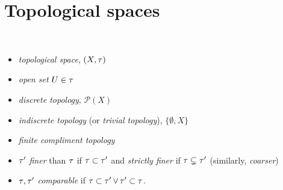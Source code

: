 \section{Topological spaces}

\begin{defn}\ 
  \begin{itemize}
  \item
    \emph{topological space}, $(X,\operatorname{\tau})$
  \item
    \emph{open set} $U\in\operatorname{\tau}$
  \item
    \emph{discrete topology}, $\mathscr P(X)$
  \item
    \emph{indiscrete topology} (or \emph{trivial topology}),
    $\{\emptyset, X\}$
  \item
    \emph{finite compliment topology}
  \item
    $\operatorname{\tau}'$ \emph{finer} than $\operatorname{\tau}$ if $\operatorname{\tau}\subset\operatorname{\tau}'$
    and \emph{strictly finer} if $\operatorname{\tau}\subsetneq\operatorname{\tau}'$
    (similarly, \emph{coarser})
  \item
    $\operatorname{\tau},\operatorname{\tau}'$ \emph{comparable} if
    $\operatorname{\tau}\subset\operatorname{\tau}' \lor \operatorname{\tau}'\subset\operatorname{\tau}$.
  \end{itemize}
\end{defn}
